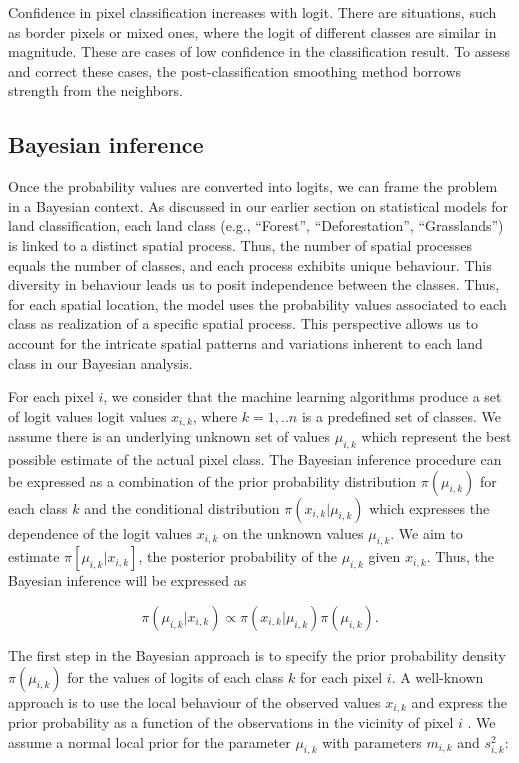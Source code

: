 \documentclass[
  shortnames]{jss}
\begin{document}
Confidence in pixel classification increases with logit. There are situations, such as border pixels or mixed ones, where the logit of different classes are similar in magnitude. These are cases of low confidence in the classification result. To assess and correct these cases, the post-classification smoothing method borrows strength from the neighbors.

\hypertarget{bayesian-inference}{%
\subsection{Bayesian inference}\label{bayesian-inference}}

Once the probability values are converted into logits, we can frame the problem in a Bayesian context. As discussed in our earlier section on statistical models for land classification, each land class (e.g., ``Forest'', ``Deforestation'', ``Grasslands'') is linked to a distinct spatial process. Thus, the number of spatial processes equals the number of classes, and each process exhibits unique behaviour. This diversity in behaviour leads us to posit independence between the classes. Thus, for each spatial location, the model uses the probability values associated to each class as realization of a specific spatial process. This perspective allows us to account for the intricate spatial patterns and variations inherent to each land class in our Bayesian analysis.

For each pixel \(i\), we consider that the machine learning algorithms produce a set of logit values logit values \(x_{i,k}\), where \(k = {1,..n}\) is a predefined set of classes. We assume there is an underlying unknown set of values \(\mu_{i,k}\) which represent the best possible estimate of the actual pixel class. The Bayesian inference procedure can be expressed as a combination of the prior probability distribution \(\pi(\mu_{i,k})\) for each class \(k\) and the conditional distribution \(\pi(x_{i,k}|\mu_{i,k})\) which expresses the dependence of the logit values \(x_{i,k}\) on the unknown values \(\mu_{i,k}\). We aim to estimate \(\pi[\mu_{i,k} | x_{i,k}]\), the posterior probability of the \(\mu_{i,k}\) given \(x_{i,k}\). Thus, the Bayesian inference will be expressed as

\begin{equation}
\pi(\mu_{i,k}|x_{i,k}) \propto{} \pi(x_{i,k}|\mu_{i,k})\pi(\mu_{i,k}).
\end{equation}

The first step in the Bayesian approach is to specify the prior probability density \(\pi(\mu_{i,k})\) for the values of logits of each class \(k\) for each pixel \(i\). A well-known approach is to use the local behaviour of the observed values \(x_{i,k}\) and express the prior probability as a function of the observations in the vicinity of pixel \(i\) \citep{Besag1991}. We assume a normal local prior for the parameter \(\mu_{i,k}\) with parameters \(m_{i,k}\) and \(s^2_{i,k}\):
\end{document}
